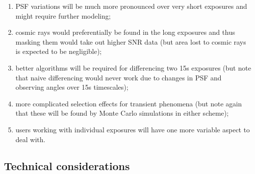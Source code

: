 \documentclass[12pt, a4paper]{article}
\begin{document}
\begin{enumerate}

\item PSF variations will be much more pronounced over very short
  exposures and might require further modeling;

\item cosmic rays would preferentially be found in the long exposures and
  thus masking them would take out higher SNR data (but
  area lost to cosmic rays is expected to be negligible);

\item better algorithms will be required for differencing two 15s
  exposures (but note that naive differencing would never work due to
  changes in PSF and observing angles over 15s timescales);

\item more complicated selection effects for transient phenomena (but
  note again that these will be found by Monte Carlo simulations in either scheme);

\item users working with individual exposures will have one more
  variable aspect to deal with.

\end{enumerate}

\subsection*{Technical considerations}
\end{document}
